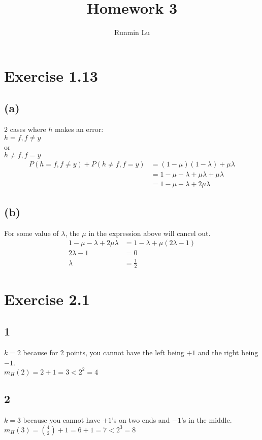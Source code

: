 \documentclass{article}
\title{Homework 3}
\author{Runmin Lu}
\begin{document}
	\maketitle
	
	\section*{Exercise 1.13}
	\subsection*{(a)}
		2 cases where $h$ makes an error:\\
		$h = f, f \neq y$\\
		or\\
		$h \neq f, f = y$
		\begin{align*}
			P(h = f, f \neq y) + P(h \neq f, f = y) &= (1 - \mu)(1 - \lambda) + \mu\lambda\\
			&= 1 - \mu - \lambda + \mu\lambda + \mu\lambda\\
			&= \boxed{1 - \mu - \lambda + 2\mu\lambda}
		\end{align*}
	\subsection*{(b)}
	For some value of $\lambda$, the $\mu$ in the expression above will cancel out.
	\begin{align*}
		1 - \mu - \lambda + 2\mu\lambda &= 1 - \lambda + \mu(2\lambda - 1)\\
		2\lambda - 1 &= 0\\
		\lambda &= \boxed{\frac12}
	\end{align*}
	
	\section*{Exercise 2.1}
	\subsection*{1}
		$k = 2$ because for 2 points, you cannot have the left being $+1$ and the right being $-1$.\\
		$m_H(2) = 2+1 = 3 < 2^2 = 4$
		
	\subsection*{2}
		$k = 3$ because you cannot have $+1$'s on two ends and $-1$'s in the middle.\\
		$m_H(3) = {4 \choose 2} + 1 = 6 + 1 = 7 < 2^3 = 8$
\end{document}
